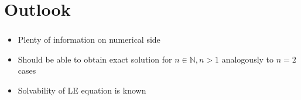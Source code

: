 \section{Outlook}

\begin{frame}
	\frametitle{\insertsection}
	\begin{itemize}%
		\item Plenty of information on numerical side
		\item Should be able to obtain exact solution for $n\in\mathbb{N}, n>1$ analogously to $n=2$ cases
		\item Solvability of LE equation is known 
	\end{itemize}
\end{frame}

